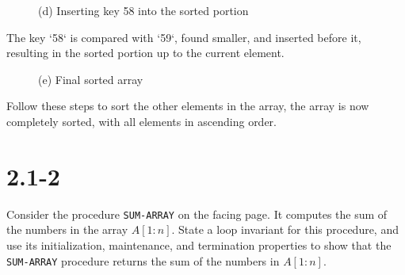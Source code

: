 \documentclass{article}
\begin{document}
\begin{figure}[h!]
    \centering
    \caption{(d) Inserting key 58 into the sorted portion}
\end{figure}

\text The key `58` is compared with `59`, found smaller, and inserted before it, resulting in the sorted portion up to the current element.

\begin{figure}[h!]
    \centering
    \caption{(e) Final sorted array}
\end{figure}

\text Follow these steps to sort the other elements in the array, the array is now completely sorted, with all elements in ascending order.

\section*{2.1-2}
Consider the procedure \texttt{SUM-ARRAY} on the facing page. It computes the sum of the numbers in the array $A[1:n]$. State a loop invariant for this procedure, and use its initialization, maintenance, and termination properties to show that the \texttt{SUM-ARRAY} procedure returns the sum of the numbers in $A[1:n]$.
\end{document}
